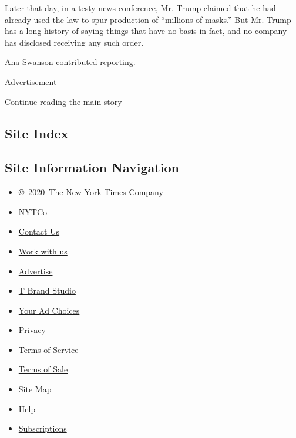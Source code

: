 Later that day, in a testy news conference, Mr. Trump claimed that he
had already used the law to spur production of ``millions of masks.''
But Mr. Trump has a long history of saying things that have no basis in
fact, and no company has disclosed receiving any such order.

Ana Swanson contributed reporting.

Advertisement

\protect\hyperlink{after-bottom}{Continue reading the main story}

\hypertarget{site-index}{%
\subsection{Site Index}\label{site-index}}

\hypertarget{site-information-navigation}{%
\subsection{Site Information
Navigation}\label{site-information-navigation}}

\begin{itemize}
\tightlist
\item
  \href{https://help.nytimes3xbfgragh.onion/hc/en-us/articles/115014792127-Copyright-notice}{©~2020~The
  New York Times Company}
\end{itemize}

\begin{itemize}
\tightlist
\item
  \href{https://www.nytco.com/}{NYTCo}
\item
  \href{https://help.nytimes3xbfgragh.onion/hc/en-us/articles/115015385887-Contact-Us}{Contact
  Us}
\item
  \href{https://www.nytco.com/careers/}{Work with us}
\item
  \href{https://nytmediakit.com/}{Advertise}
\item
  \href{http://www.tbrandstudio.com/}{T Brand Studio}
\item
  \href{https://www.nytimes3xbfgragh.onion/privacy/cookie-policy\#how-do-i-manage-trackers}{Your
  Ad Choices}
\item
  \href{https://www.nytimes3xbfgragh.onion/privacy}{Privacy}
\item
  \href{https://help.nytimes3xbfgragh.onion/hc/en-us/articles/115014893428-Terms-of-service}{Terms
  of Service}
\item
  \href{https://help.nytimes3xbfgragh.onion/hc/en-us/articles/115014893968-Terms-of-sale}{Terms
  of Sale}
\item
  \href{https://spiderbites.nytimes3xbfgragh.onion}{Site Map}
\item
  \href{https://help.nytimes3xbfgragh.onion/hc/en-us}{Help}
\item
  \href{https://www.nytimes3xbfgragh.onion/subscription?campaignId=37WXW}{Subscriptions}
\end{itemize}
